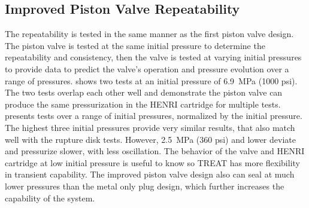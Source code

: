 \subsection{Improved Piston Valve Repeatability} \label{ss:new repeatability}
The repeatability is tested in the same manner as the first piston valve design. The piston valve is tested at the same initial pressure to determine the repeatability and consistency, then the valve is tested at varying initial pressures to provide data to predict the valve's operation and pressure evolution over a range of pressures.  shows two tests at an initial pressure of \SI{6.9}{\mega\pascal} (1000 psi). The two tests overlap each other well and demonstrate the piston valve can produce the same pressurization in the HENRI cartridge for multiple tests.  presents tests over a range of initial pressures, normalized by the initial pressure. The highest three initial pressures provide very similar results, that also match well with the rupture disk tests. However, \SI{2.5}{\mega\pascal} (360 psi) and lower deviate and pressurize slower, with less oscillation. The behavior of the valve and HENRI cartridge at low initial pressure is useful to know so TREAT has more flexibility in transient capability. The improved piston valve design also can seal at much lower pressures than the metal only plug design, which further increases the capability of the system.

